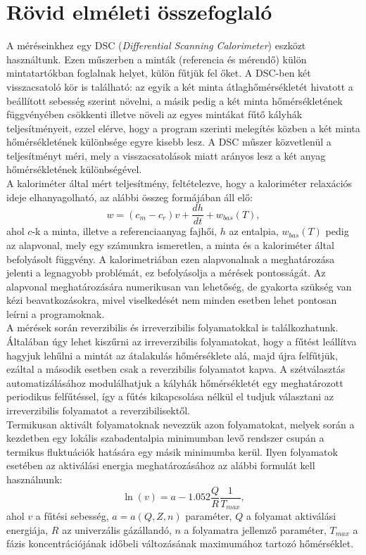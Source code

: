\documentclass[12pt,a4paper]{article}
\begin{document}
\section{Rövid elméleti összefoglaló}
 
\hspace*{10pt} A méréseinkhez egy DSC (\emph{Differential Scanning Calorimeter}) eszközt használtunk. Ezen műszerben a minták (referencia és mérendő) külön mintatartókban foglalnak helyet, külön fűtjük fel őket. A DSC-ben két visszacsatoló kör is található: az egyik a két minta átlaghőmérsékletét hivatott a beállított sebesség szerint növelni, a másik pedig a két minta hőmérsékletének függvényében csökkenti illetve növeli az egyes mintákat fűtő kályhák teljesítményeit, ezzel elérve, hogy a program szerinti melegítés közben a két minta hőmérsékletének különbsége egyre kisebb lesz. A DSC műszer közvetlenül a teljesítményt méri, mely a visszacsatolások miatt arányos lesz a két anyag hőmérsékletének különbségével.\\
\hspace*{10pt} A kaloriméter által mért teljesítmény, feltételezve, hogy a kaloriméter relaxációs ideje elhanyagolható, az alábbi összeg formájában áll elő:
\begin{equation}
w=(c_m - c_r )v+\frac{dh}{dt} + w_{bas}(T),
\end{equation}
ahol $c$-k a minta, illetve a referenciaanyag fajhői, $h$ az entalpia, $w_{bas}(T)$ pedig az alapvonal, mely egy számunkra ismeretlen, a minta és a kaloriméter által befolyásolt függvény. A kalorimetriában ezen alapvonalnak a meghatározása jelenti a legnagyobb problémát, ez befolyásolja a mérések pontosságát. Az alapvonal meghatározására numerikusan van lehetőség, de gyakorta szükség van kézi beavatkozásokra, mivel viselkedését nem minden esetben lehet pontosan leírni a programoknak.\\
\hspace*{10pt} A mérések során reverzibilis és irreverzibilis folyamatokkal is találkozhatunk. Általában úgy lehet kiszűrni az irreverzibilis folyamatokat, hogy a fűtést leállítva hagyjuk lehűlni a mintát az átalakulás hőmérséklete alá, majd újra felfűtjük, ezáltal a második esetben csak a reverzibilis folyamatot kapva.  A szétválasztás automatizálásához modulálhatjuk a kályhák hőmérsékletét egy meghatározott periodikus felfűtéssel, így a fűtés kikapcsolása nélkül el tudjuk választani az irreverzibilis folyamatot a reverzibilisektől.\\
\hspace*{10pt} Termikusan aktivált folyamatoknak nevezzük azon folyamatokat, melyek során a kezdetben egy lokális szabadentalpia minimumban levő rendszer csupán a termikus fluktuációk hatására egy másik minimumba kerül. Ilyen folyamatok esetében az aktiválási energia meghatározásához az alábbi formulát kell használnunk:
\newpage
\begin{equation}
\ln (v) = a-1.052 \frac{Q}{R}\frac{1}{T_{max}},
\end{equation}
ahol $v$ a fűtési sebesség, $a=a(Q,Z,n)$ paraméter, $Q$ a folyamat aktiválási energiája, $R$ az univerzális gázállandó, $n$ a folyamatra jellemző paraméter, $T_{max}$  a fázis koncentrációjának időbeli változásának maximumához tartozó hőmérséklet.
\end{document}
